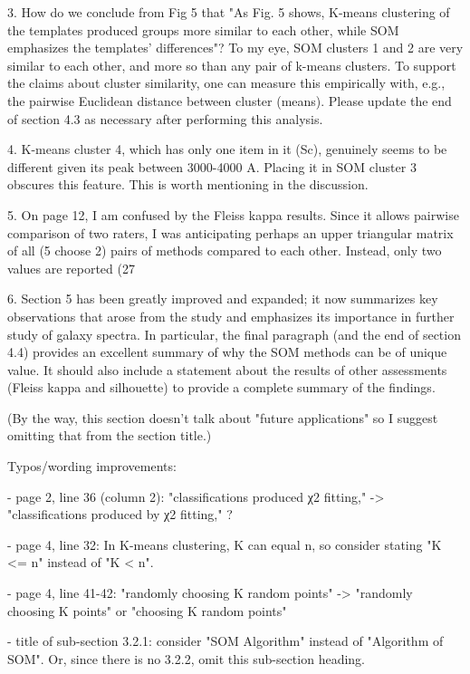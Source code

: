 3. How do we conclude from Fig 5 that "As Fig. 5 shows, K-means clustering of the templates produced groups more similar to each other, while SOM emphasizes the templates’ differences"?  To my eye, SOM clusters 1 and 2 are very similar to each other, and more so than any pair of k-means clusters.  To support the claims about cluster similarity, one can measure this empirically with, e.g., the pairwise Euclidean distance between cluster (means).  Please update the end of section 4.3 as necessary after performing this analysis.

4. K-means cluster 4, which has only one item in it (Sc), genuinely seems to be different given its peak between 3000-4000 A.  Placing it in SOM cluster 3 obscures this feature.  This is worth mentioning in the discussion.

5. On page 12, I am confused by the Fleiss kappa results.  Since it allows pairwise comparison of two raters, I was anticipating perhaps an upper triangular matrix of all (5 choose 2) pairs of methods compared to each other.  Instead, only two values are reported (27%

6. Section 5 has been greatly improved and expanded; it now summarizes key observations that arose from the study and emphasizes its importance in further study of galaxy spectra.  In particular, the final paragraph (and the end of section 4.4) provides an excellent summary of why the SOM methods can be of unique value.  It should also include a statement about the results of other assessments (Fleiss kappa and silhouette) to provide a complete summary of the findings.

(By the way, this section doesn't talk about "future applications" so I suggest omitting that from the section title.)

Typos/wording improvements:

- page 2, line 36 (column 2):
"classifications produced χ2 fitting," ->
"classifications produced by χ2 fitting," ?

- page 4, line 32:  In K-means clustering, K can equal n, so consider stating "K <= n" instead of "K < n".

- page 4, line 41-42:
"randomly choosing K random points" ->
"randomly choosing K points" or
"choosing K random points"

- title of sub-section 3.2.1: consider "SOM Algorithm" instead of "Algorithm of SOM".  Or, since there is no 3.2.2, omit this sub-section heading.

